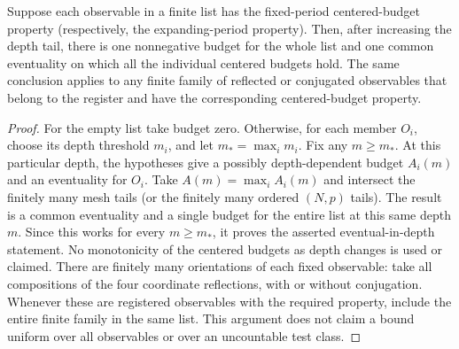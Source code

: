 \begin{lemma}\label{ex-centered-finite}
Suppose each observable in a finite list has the fixed-period centered-budget property (respectively, the expanding-period property). Then, after increasing the depth tail, there is one nonnegative budget for the whole list and one common eventuality on which all the individual centered budgets hold. The same conclusion applies to any finite family of reflected or conjugated observables that belong to the register and have the corresponding centered-budget property.
\end{lemma}
\begin{proof}
For the empty list take budget zero. Otherwise, for each member $O_i$, choose its depth threshold $m_i$, and let $m_* = \max_i m_i$. Fix any $m\geq m_*$. At this particular depth, the hypotheses give a possibly depth-dependent budget $A_i(m)$ and an eventuality for $O_i$. Take $A(m)=\max_i A_i(m)$ and intersect the finitely many mesh tails (or the finitely many ordered $(N,p)$ tails). The result is a common eventuality and a single budget for the entire list at this same depth $m$. Since this works for every $m\geq m_*$, it proves the asserted eventual-in-depth statement. No monotonicity of the centered budgets as depth changes is used or claimed. There are finitely many orientations of each fixed observable: take all compositions of the four coordinate reflections, with or without conjugation. Whenever these are registered observables with the required property, include the entire finite family in the same list. This argument does not claim a bound uniform over all observables or over an uncountable test class.
\end{proof}

